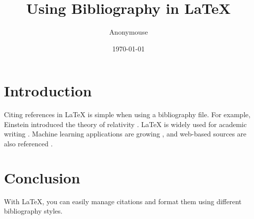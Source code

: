 \documentclass[12pt]{article}
\begin{document}
\title{Using Bibliography in \LaTeX}
\author{Anonymouse}
\date{\today}
\maketitle

\section{Introduction}
Citing references in LaTeX is simple when using a bibliography file. 
For example, Einstein introduced the theory of relativity \cite{einstein1905}.  
LaTeX is widely used for academic writing \cite{lamport1986}.  
Machine learning applications are growing \cite{goodfellow2016deep}, and web-based sources are also referenced \cite{latexwebsite}.

\section{Conclusion}
With \LaTeX, you can easily manage citations and format them using different bibliography styles.

  
\end{document}
